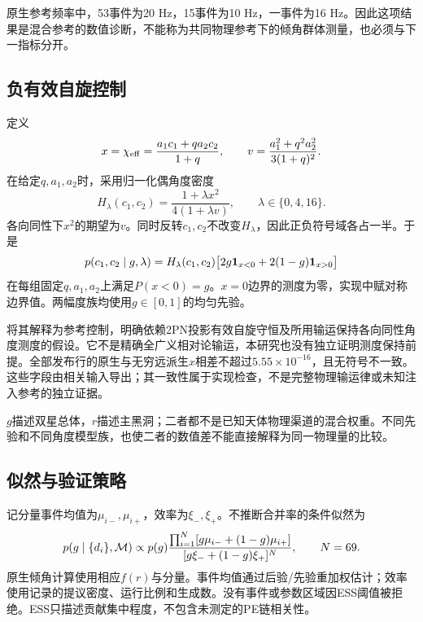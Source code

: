 原生参考频率中，53事件为20 Hz，15事件为10 Hz，一事件为16 Hz。因此这项结果是混合参考的数值诊断，不能称为共同物理参考下的倾角群体测量，也必须与下一指标分开。

\subsection{负有效自旋控制}
定义
\begin{equation}
 x=\chi_{\mathrm{eff}}=\frac{a_1c_1+qa_2c_2}{1+q},\qquad
 v=\frac{a_1^2+q^2a_2^2}{3(1+q)^2}.
\end{equation}
在给定$q,a_1,a_2$时，采用归一化偶角度密度
\begin{equation}
 H_\lambda(c_1,c_2)=\frac{1+\lambda x^2}{4(1+\lambda v)},\qquad
 \lambda\in\{0,4,16\}.
\end{equation}
各向同性下$x^2$的期望为$v$。同时反转$c_1,c_2$不改变$H_\lambda$，因此正负符号域各占一半。于是
\begin{equation}
 p(c_1,c_2\mid g,\lambda)=H_\lambda(c_1,c_2)
 \big[2g\mathbf{1}_{x<0}+2(1-g)\mathbf{1}_{x>0}\big]\label{eq:gmodel}
\end{equation}
在每组固定$q,a_1,a_2$上满足$P(x<0)=g$。$x=0$边界的测度为零，实现中赋对称边界值。两幅度族均使用$g\in[0,1]$的均匀先验。

将其解释为参考控制，明确依赖2PN投影有效自旋守恒及所用输运保持各向同性角度测度的假设。它不是精确全广义相对论输运，本研究也没有独立证明测度保持前提。全部发布行的原生与无穷远派生$x$相差不超过$5.55\times10^{-16}$，且无符号不一致。这些字段由相关输入导出；其一致性属于实现检查，不是完整物理输运律或未知注入参考的独立证据。

$g$描述双星总体，$r$描述主黑洞；二者都不是已知天体物理渠道的混合权重。不同先验和不同角度模型族，也使二者的数值差不能直接解释为同一物理量的比较。

\subsection{似然与验证策略}
记分量事件均值为$\mu_{i-},\mu_{i+}$，效率为$\xi_-,\xi_+$。不推断合并率的条件似然为
\begin{equation}
 p(g\mid\{d_i\},{\cal M})\propto p(g)
 \frac{\prod_{i=1}^{N}[g\mu_{i-}+(1-g)\mu_{i+}]}
 {[g\xi_-+(1-g)\xi_+]^N},\qquad N=69.\label{eq:likelihood}
\end{equation}
原生倾角计算使用相应$f(r)$与分量。事件均值通过后验/先验重加权估计；效率使用记录的提议密度、运行比例和生成数。没有事件或参数区域因ESS阈值被拒绝。ESS只描述贡献集中程度，不包含未测定的PE链相关性。


